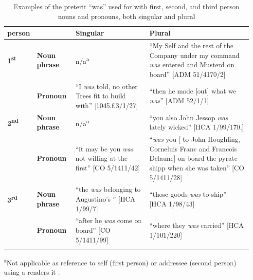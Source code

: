 \begin{table}
\caption{\label{tab:key:6.1} Examples of the preterit “was” used for with first, second, and third person nouns and pronouns, both singular and plural}
\small 
\begin{tabularx}{\textwidth}{llQQ} 
\lsptoprule
person &  & \textbf{Singular} & \textbf{Plural}\\
\midrule
 \textbf{1\textsuperscript{st}}  & \textbf{Noun phrase} & n/a\textsuperscript{a} & “My Self and the rest of the Company under my command \textit{was} entered and Musterd on board” [ADM 51/4170/2]\\
\tablevspace
& \textbf{Pronoun} & “I \textit{was} told, no other Trees fit to build with” [1045.f.3/1/27] & “then he made [out] what we \textit{was}” [ADM 52/1/1]\\

\midrule
 \textbf{2\textsuperscript{nd}}  & \textbf{Noun phrase} & n/a\textsuperscript{a} & “you also John Jessop \textit{was} lately wicked” [HCA 1/99/170,]\\
\tablevspace
& \textbf{Pronoun} & “it may be you \textit{was} not willing at the first” [CO 5/1411/42] & “\textit{was} you [ to John Houghling, Corneluis Franc and Francois Delaune] on board the pyrate shipp when she was taken” [CO 5/1411/28] \\

\midrule 
 \textbf{3\textsuperscript{rd}}  & \textbf{Noun phrase} & “the  \textit{was} belonging to Augustino’s ” [HCA 1/99/7] & “those goods \textit{was} to ship” [HCA 1/98/43] \\
\tablevspace
& \textbf{Pronoun} & “after he \textit{was} come on board” [CO 5/1411/99] & “where they \textit{was} carried” [HCA 1/101/220]\\

\lspbottomrule
\end{tabularx}
\parbox{\textwidth}{\footnotesize
\textsuperscript{a}Not applicable as reference to self (first person) or addressee (second person) using a  renders it .
}

\end{table}

